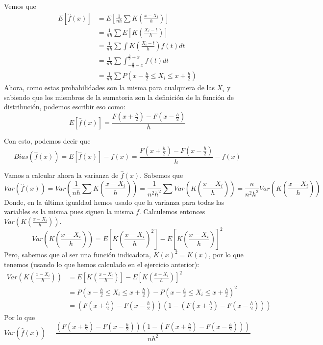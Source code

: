 \documentclass[11pt]{article}
\begin{document}
Vemos que \begin{align*}
E\left[\hat{f}(x)\right] & = E \left[ \frac{1}{nh} \sum K\left( \frac{x - X_i}{h}\right)\right]\\
 & = \frac{1}{nh}  \sum  E \left[  K\left( \frac{X_i - t}{h}\right) \right] \\
 &= \frac{1}{nh}  \sum \int  K\left( \frac{X_i - t}{h}\right) f(t) dt \\
 & = \frac{1}{nh} \sum \int_{-\frac{h}{2} - x}^{\frac{h}{2}  + x} f(t) dt\\
 & =  \frac{1}{nh} \sum  P\left(x -\frac{h}{2}  \leq X_i \leq x + \frac{h}{2}\right)
\end{align*} Ahora, como estas probabilidades son la misma para
cualquiera de las \(X_i\) y sabiendo que los miembros de la sumatoria
son la definición de la función de distribución, podemos escribir eso
como: \[
E\left[\hat{f}(x)\right] = \frac{F(x + \frac{h}{2}) - F(x -\frac{h}{2})}{h}
\]

Con esto, podemos decir que \[
Bias(\hat{f}(x)) = E\left[\hat{f}(x)\right] - f(x) = \frac{F(x + \frac{h}{2}) - F(x -\frac{h}{2})}{h} - f(x)
\]

Vamos a calcular ahora la varianza de \(\hat{f}(x)\). Sabemos que \[
Var(\hat{f}(x)) = Var\left(\frac{1}{nh} \sum K\left( \frac{x - X_i}{h}\right)\right) = \frac{1}{n^2 h^2} \sum Var\left(K\left( \frac{x - X_i}{h}\right)\right) = \frac{n}{n^2 h^2} Var\left(K\left( \frac{x - X_i}{h}\right)\right)
\] Donde, en la última igualdad hemos usado que la varianza para todas
las variables es la misma pues siguen la misma \(f\). Calculemos
entonces \(Var\left(K\left( \frac{x - X_i}{h}\right)\right)\). \[
Var\left(K\left( \frac{x - X_i}{h}\right)\right) = E\left[K\left( \frac{x - X_i}{h}\right)^2\right] - E\left[K\left( \frac{x - X_i}{h}\right)\right]^2
\] Pero, sabemos que al ser una función indicadora, \(K(x)^2 = K(x)\),
por lo que tenemos (usando lo que hemos calculado en el ejercicio
anterior): \begin{align*}
Var\left(K\left( \frac{x - X_i}{h}\right)\right) & = E\left[K\left( \frac{x - X_i}{h}\right)\right] - E\left[K\left( \frac{x - X_i}{h}\right)\right]^2 \\
& = P\left(x -\frac{h}{2}  \leq X_i \leq x + \frac{h}{2}\right) - P\left(x -\frac{h}{2}  \leq X_i \leq x + \frac{h}{2}\right)^2\\
& = \left(F\left(x + \frac{h}{2}\right) - F\left(x -\frac{h}{2}\right)\right)  \left(1 - \left(F(x + \frac{h}{2}) - F(x -\frac{h}{2})\right)\right)
\end{align*} Por lo que \[
Var(\hat{f}(x)) = \frac{\left(F\left(x + \frac{h}{2}\right) - F\left(x -\frac{h}{2}\right)\right)  \left(1 - \left(F(x + \frac{h}{2}) - F(x -\frac{h}{2})\right)\right)}{n h^2}
\]
\end{document}
